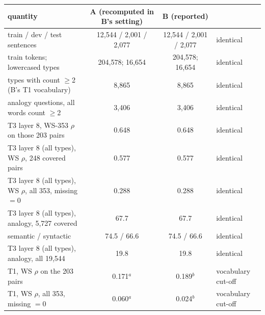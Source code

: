 \begin{tabular}{lccl}
\toprule
quantity & A (recomputed in B's setting) & B (reported) & \\
\midrule
train / dev / test sentences & 12,544 / 2,001 / 2,077 & 12,544 / 2,001 / 2,077 & identical \\
train tokens; lowercased types & 204,578; 16,654 & 204,578; 16,654 & identical \\
types with count $\ge$2 (B's T1 vocabulary) & 8,865 & 8,865 & identical \\
analogy questions, all words count $\ge$2 & 3,406 & 3,406 & identical \\
T3 layer 8, WS-353 $\rho$ on those 203 pairs & 0.648 & 0.648 & identical \\
T3 layer 8 (all types), WS $\rho$, 248 covered pairs & 0.577 & 0.577 & identical \\
T3 layer 8 (all types), WS $\rho$, all 353, missing $=0$ & 0.288 & 0.288 & identical \\
T3 layer 8 (all types), analogy, 5,727 covered & 67.7 & 67.7 & identical \\
\quad semantic / syntactic & 74.5 / 66.6 & 74.5 / 66.6 & identical \\
T3 layer 8 (all types), analogy, all 19,544 & 19.8 & 19.8 & identical \\
T1, WS $\rho$ on the 203 pairs & 0.171$^a$ & 0.189$^b$ & vocabulary cut-off \\
T1, WS $\rho$, all 353, missing $=0$ & 0.060$^a$ & 0.024$^b$ & vocabulary cut-off \\
\bottomrule
\end{tabular}
